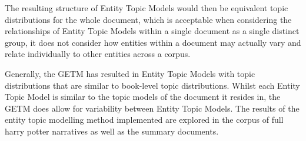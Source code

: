 \documentclass[10pt]{report}
\begin{document}
The resulting structure of Entity Topic Models would then be equivalent topic distributions for the whole document, which is acceptable when considering the relationships of Entity Topic Models within a single document as a single distinct group, it does not consider how entities within a document may actually vary and relate individually to other entities across a corpus.

Generally, the GETM has resulted in Entity Topic Models with topic distributions that are similar to book-level topic distributions. Whilst each Entity Topic Model is similar to the topic models of the document it resides in, the GETM does allow for variability between Entity Topic Models. The results of the entity topic modelling method implemented are explored in the corpus of full harry potter narratives as well as the summary documents.

\clearpage
\end{document}
